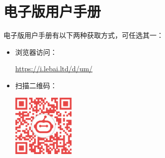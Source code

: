 \chapter*{电子版用户手册}

\setlength\parindent{0pt}

电子版用户手册有以下两种获取方式，可任选其一：

\vspace*{1em}

\begin{itemize}
    \item 浏览器访问：

    \begin{center}
    \centering
    \url{https://i.lebai.ltd/d/um/}
    \qquad
    \end{center}

    \vspace*{1em}

    \item 扫描二维码：

\begin{center}
    \includegraphics[width=3cm]{image/qr_code.pdf}
    \qquad
\end{center}

\end{itemize}
